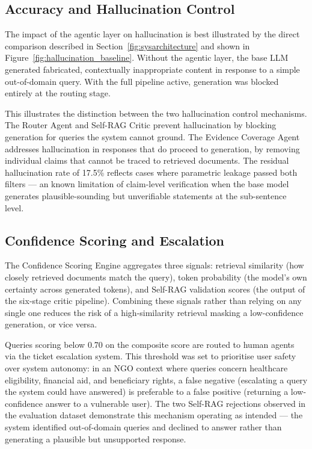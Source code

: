 \subsection{Accuracy and Hallucination Control}

The impact of the agentic layer on hallucination is best illustrated by the 
direct comparison described in Section~\ref{fig:sysarchitecture} and shown in 
Figure~\ref{fig:hallucination_baseline}. Without the agentic layer, the base 
LLM generated fabricated, contextually inappropriate content in response to a 
simple out-of-domain query. With the full pipeline active, generation was 
blocked entirely at the routing stage.

This illustrates the distinction between the two hallucination control 
mechanisms. The Router Agent and Self-RAG Critic prevent hallucination by 
blocking generation for queries the system cannot ground. The Evidence Coverage 
Agent addresses hallucination in responses that do proceed to generation, by 
removing individual claims that cannot be traced to retrieved documents. The 
residual hallucination rate of 17.5\% reflects cases where parametric leakage 
passed both filters — an known limitation of claim-level verification when the 
base model generates plausible-sounding but unverifiable statements at the 
sub-sentence level.

\subsection{Confidence Scoring and Escalation}

The Confidence Scoring Engine aggregates three signals: retrieval similarity 
(how closely retrieved documents match the query), token probability (the 
model's own certainty across generated tokens), and Self-RAG validation scores 
(the output of the six-stage critic pipeline). Combining these signals rather 
than relying on any single one reduces the risk of a high-similarity retrieval 
masking a low-confidence generation, or vice versa.

Queries scoring below 0.70 on the composite score are routed to human agents 
via the ticket escalation system. This threshold was set to prioritise user 
safety over system autonomy: in an NGO context where queries concern healthcare 
eligibility, financial aid, and beneficiary rights, a false negative (escalating 
a query the system could have answered) is preferable to a false positive 
(returning a low-confidence answer to a vulnerable user). The two Self-RAG 
rejections observed in the evaluation dataset demonstrate this mechanism 
operating as intended — the system identified out-of-domain queries and declined 
to answer rather than generating a plausible but unsupported response.

